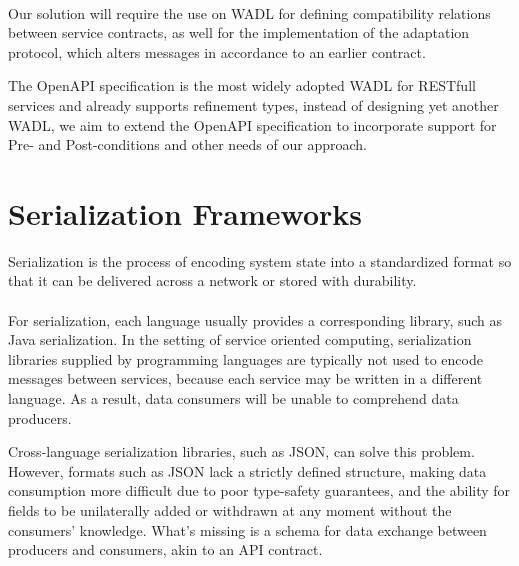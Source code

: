 \paragraph{}

Our solution will require the use on WADL for defining compatibility relations between service contracts,
as well for the implementation of the adaptation protocol, which alters messages in accordance to an earlier contract.

The OpenAPI specification is the most widely adopted WADL for RESTfull services and already supports refinement types, instead of designing yet another WADL,
we aim to extend the OpenAPI specification to incorporate support for Pre- and Post-conditions and other needs of our approach.

\section{Serialization Frameworks} %
\label{sec:serialization_frameworks}

Serialization is the process of encoding system state into a standardized format so that it can be delivered across a network or stored with durability.

\paragraph{}

For serialization, each language usually provides a corresponding library, such as Java serialization.
In the setting of service oriented computing, serialization libraries supplied by programming languages are typically not used to encode messages between services,
because each service may be written in a different language. As a result, data consumers will be unable to comprehend data producers.

Cross-language serialization libraries, such as JSON, can solve this problem.
However, formats such as JSON lack a strictly defined structure,
making data consumption more difficult due to poor type-safety guarantees, and the ability for fields to be unilaterally added or withdrawn at any moment without the consumers' knowledge.
What's missing is a schema for data exchange between producers and consumers, akin to an API contract.

\paragraph{}

